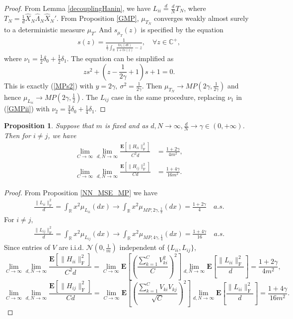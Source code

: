 \documentclass{article}
\newcommand{\E}{\mathbf{E}}
\newcommand{\mb}{\mathbb}
\newcommand\ml{\mathcal}
\newcommand{\rw}{\rightarrow}
\newcommand{\1}{^{(1)}}
\newcommand{\2}{^{(2)}}
\renewcommand{\l}{\left}
\renewcommand{\r}{\right}
\newtheorem{prop}{Proposition}
\newcommand{\bea}{\begin{equation}\begin{aligned}}
\newcommand{\eea}{\end{aligned}\end{equation}}
\begin{document}
\begin{proof}
    From Lemma \ref{decouplingHanin}, we have $L_{ii}\stackrel{d}{=}\frac{d}{N}T_N$, where $T_N=\frac{1}{d}\hat{X}_N\hat{\Lambda}_N\hat{X}_N'$.
From Proposition \ref{GMP}, $\mu_{T_N}$ converges weakly almost surely to a deterministic measure $\mu_{T}$. And $s_{\mu_{T}}(z)$ is specified by the equation
\bea\label{GMPii}
s(z)=\frac{1}{\frac{1}{\gamma}\int_{\mathbb{R}}\frac
    {t\nu_1(dt)}{1+ts(z)}-z},\quad \forall z\in\mathbb{C}^+,
\eea
where $\nu_1=\frac{1}{2}\delta_0+\frac{1}{2}\delta_1$. The equation can be simplified as 
$$
zs^2+\l(z-\frac
{1}{2\gamma}+1\r)s+1=0.
$$
This is exactly (\ref{MPs2}) with $y=2\gamma,\ \sigma^2=\frac{1}{2\gamma}$. Then $\mu_{T_N}\rw MP(2\gamma,\frac
{1}{2\gamma})$ and hence $\mu_{L_{ii}}\rw MP(2\gamma,\frac
{1}{2})$. The $L_{ij}$ case in the same procedure, replacing $\nu_1$ in (\ref{GMPii}) with $\nu_2=\frac{3}{4}\delta_0+\frac{1}{4}\delta_1$. 
\end{proof}

\begin{prop}
    Suppose that $m$ is fixed and as $d,N\rw\infty, \frac
    {d}{N}\rw \gamma\in (0,+\infty)$. Then for $i\ne j$, we have
    \bea
\lim_{C\rw\infty}\lim_{d,N\rw\infty}\frac{\E\l[\|H_{ii}\|_{\operatorname{F}}^2\r]}{C^2d}&=\frac{1+2\gamma}{4m^2},\\
\lim_{C\rw\infty}\lim_{d,N\rw\infty}\frac{\E\l[\|H_{ij}\|_{\operatorname{F}}^2\r]}{Cd}&=\frac{1+4\gamma}{16m^2}.
        \eea
\end{prop}

\begin{proof}
    From Proposition \ref{NN_MSE_MP} we have
    \bea\label{eqRHSuii}
    \frac{\|L_{ii}\|_{\operatorname{F}}^2}{d}=\int_{\mb{R}} x^2\mu_{L_{ii}}(dx)\rw \int_{\mb{R}} x^2\mu_{MP,2\gamma,\frac{1}{2}}(dx)=\frac{1+2\gamma}{4}\quad a.s.
    \eea
    For $i\ne j$, 
    \bea\label{eqRHSuij}
    \frac{\|L_{ij}\|_{\operatorname{F}}^2}{d}=\int_{\mb{R}} x^2\mu_{L_{ij}}(dx)\rw \int_{\mb{R}} x^2\mu_{MP,4\gamma,\frac{1}{4}}(dx)=\frac{1+4\gamma}{16}\quad a.s.
    \eea
    Since entries of $V$ are i.i.d. $\ml{N}(0,\frac{1}{m})$ independent of $\{L_{ii},L_{ij}\}$,
    $$
    \lim_{C\rw\infty}\lim_{d,N\rw\infty}\frac{\E\l[\|H_{ii}\|_{\operatorname{F}}^2\r]}{C^2d}=\lim_{C\rw\infty}\E\l[\l(\frac{\sum_{k=1}^C V_{ki}^2}{C}\r)^2\r]\lim_{d,N\rw\infty}\E\l[\frac{\|L_{ii}\|_{\operatorname{F}}^2}{d}\r]=\frac{1+2\gamma}{4m^2},
    $$
    $$
    \lim_{C\rw\infty}\lim_{d,N\rw\infty}\frac{\E\l[\|H_{ij}\|_{\operatorname{F}}^2\r]}{Cd}=\lim_{C\rw\infty}\E\l[\l(\frac{\sum_{k=1}^C V_{ki}V_{kj}}{\sqrt{C}}\r)^2\r]\lim_{d,N\rw\infty}\E\l[\frac{\|L_{ii}\|_{\operatorname{F}}^2}{d}\r]=\frac{1+4\gamma}{16m^2}.
    $$
\end{proof}
\end{document}
